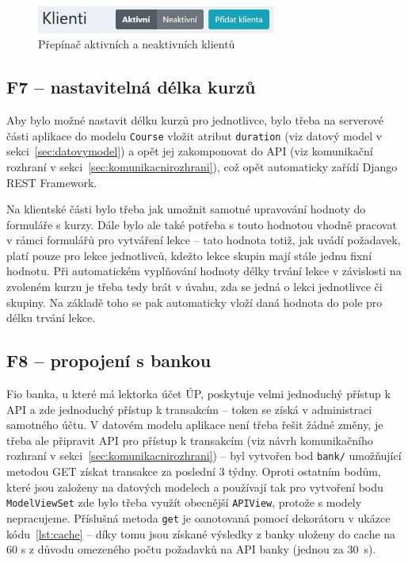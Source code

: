 \begin{figure}[h]\centering
    \includegraphics[width=0.7\textwidth]{img/ui-screen-prepinac-aktivity.png}
    \caption{Přepínač aktivních a neaktivních klientů}\label{fig:ui-screen-prepinac-aktivity}
\end{figure}

\subsection{F7 -- nastavitelná délka kurzů}

Aby bylo možné nastavit délku kurzů pro jednotlivce, bylo třeba na serverové části aplikace do modelu \verb|Course| vložit atribut \verb|duration| (viz datový model v sekci~\ref{sec:datovymodel}) a opět jej zakomponovat do API (viz komunikační rozhraní v sekci~\ref{sec:komunikacnirozhrani}), což opět automaticky zařídí Django REST Framework.

Na klientské části bylo třeba jak umožnit samotné upravování hodnoty do formuláře s kurzy. Dále bylo ale také potřeba s touto hodnotou vhodně pracovat v rámci formulářů pro vytváření lekce -- tato hodnota totiž, jak uvádí požadavek, platí pouze pro lekce jednotlivců, kdežto lekce skupin mají stále jednu fixní hodnotu. Při automatickém vyplňování hodnoty délky trvání lekce v závislosti na zvoleném kurzu je třeba tedy brát v úvahu, zda se jedná o lekci jednotlivce či skupiny. Na základě toho se pak automaticky vloží daná hodnota do pole pro délku trvání lekce.

\subsection{F8 -- propojení s bankou}

Fio banka, u které má lektorka účet ÚP, poskytuje velmi jednoduchý přístup k API a zde jednoduchý přístup k transakcím -- token se získá v administraci samotného účtu. V datovém modelu aplikace není třeba řešit žádné změny, je třeba ale připravit API pro přístup k transakcím (viz návrh komunikačního rozhraní v sekci~\ref{sec:komunikacnirozhrani}) -- byl vytvořen bod \verb|bank/| umožňující metodou GET získat transakce za poslední 3 týdny. Oproti ostatním bodům, které jsou založeny na datových modelech a používají tak pro vytvoření bodu \verb|ModelViewSet| zde bylo třeba využít obecnější \verb|APIView|, protože s modely nepracujeme. Příslušná metoda \verb|get| je oanotovaná pomocí dekorátoru v ukázce kódu~\ref{lst:cache} -- díky tomu jsou získané výsledky z banky uloženy do cache na 60 s z důvodu omezeného počtu požadavků na API banky (jednou za 30~s).

